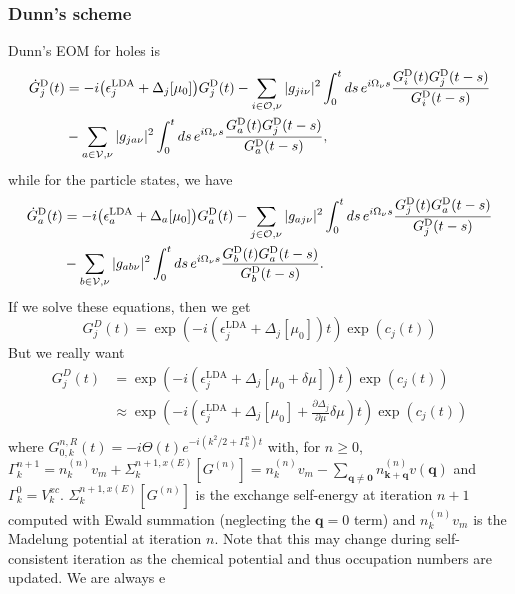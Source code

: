 \subsubsection{Dunn's scheme}
Dunn's EOM for holes is
\begin{align}
    \dot G_j^{\rm D}(t)
    &=
    -i\bigl(\epsilon_j^{\mathrm{LDA}}+\Delta_j[\mu_0]\bigr)G^{\rm D}_j(t)
    -
    \sum_{i\in \mathcal{O},\nu}|g_{ji\nu}|^2
    \int_0^t ds\,e^{i\Omega_\nu s}
    \frac{G^{\rm D}_i(t)G^{\mathrm{D}}_j(t-s)}{G^{\mathrm{D}}_i(t-s)}\\
&- \sum_{a\in\mathcal V,\nu}|g_{ja\nu}|^2
\int_0^t ds\,e^{i\Omega_\nu s}
\frac{G^{\rm D}_a(t)G^{\mathrm{D}}_j(t-s)}{G^{\mathrm{D}}_a(t-s)},
\end{align}
while for the particle states, we have
\begin{align}
    \dot G_a^{\rm D}(t)
    &=
    -i\bigl(\epsilon_a^{\mathrm{LDA}}+\Delta_a[\mu_0]\bigr)G^{\rm D}_a(t)
    -
    \sum_{j\in \mathcal{O},\nu}|g_{aj\nu}|^2
    \int_0^t ds\,e^{i\Omega_\nu s}
    \frac{G^{\rm D}_j(t)G^{\mathrm{D}}_a(t-s)}{G^{\mathrm{D}}_j(t-s)}\\
&- \sum_{b\in\mathcal V,\nu}|g_{ab\nu}|^2
\int_0^t ds\,e^{i\Omega_\nu s}
\frac{G^{\rm D}_b(t)G^{\mathrm{D}}_a(t-s)}{G^{\mathrm{D}}_b(t-s)}.
\end{align}
If we solve these equations, then we get 
\begin{equation}
    G^D_j(t)= \exp(-i(\epsilon_j^{\mathrm{LDA}}+\Delta_j[\mu_0])t) \exp(c_j(t))
\end{equation}
But we really want 
\begin{align}
    G^D_j(t)&= \exp(-i(\epsilon_j^{\mathrm{LDA}}+\Delta_j[\mu_0+\delta\mu])t) \exp(c_j(t))\\
&\approx \exp(-i(\epsilon_j^{\mathrm{LDA}}+\Delta_j[\mu_0] + \frac{\partial \Delta_j}{\partial \mu}\delta\mu)t) \exp(c_j(t))\\
\end{align}
where $G_{0,k}^{n,R}(t) = -i \Theta(t) e^{-i \left(k^2/2 + \Gamma_k^{n}\right) t}$ with, for $n\geq0$, $\Gamma_k^{n+1} = n_{k}^{(n)}v_m+\Sigma_k^{n+1,x(E)}[G^{(n)}]=n_{k}^{(n)}v_m-\sum_{\bm{q}\neq\bm{0}} n_{\bm{k}+\bm{q}}^{(n)}v(\bm{q})$ and $\Gamma_k^{0} = V_k^{xc}$. $\Sigma_k^{n+1,x(E)}[G^{(n)}]$ is the exchange self-energy at iteration $n+1$ computed with Ewald summation (neglecting the $\bm{q}=0$ term) and $n_{k}^{(n)}v_m$ is the Madelung potential at iteration $n$. Note that this may change during self-consistent iteration as the chemical potential and thus occupation numbers are updated. We are always e
